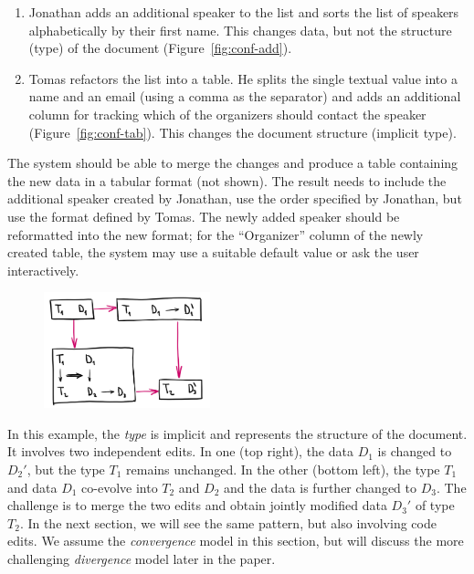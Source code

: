 \documentclass[english,submission]{programming}
\DeclareRobustCommand{\frameworkbox}[2][gray!15]{
\begin{tcolorbox}[breakable,left=3pt,right=3pt,top=3pt,bottom=3pt,colback=#1,colframe=#1,parbox=false,
  width=\dimexpr\textwidth\relax,enlarge left by=0mm,boxsep=5pt,arc=0pt,enlarge top by=0.5em,%
  outer arc=0pt]\setlength{\parskip}{0.5em}#2
\end{tcolorbox}}
\newcommand{\frameworkboxtitle}[1]{\setlength{\parindent}{0em}{\firamedium #1.}\quad}
\begin{document}
\begin{enumerate}
\item Jonathan adds an additional speaker to the list and sorts the list of speakers
  alphabetically by their first name. This changes data, but not the structure (type) of
  the document (Figure~\ref{fig:conf-add}).
\item Tomas refactors the list into a table. He splits the single textual value
  into a name and an email (using a comma as the separator) and adds an additional column for
  tracking which of the organizers should contact the speaker (Figure~\ref{fig:conf-tab}).
  This changes the document structure (implicit type).
\end{enumerate}

\noindent
The system should be able to merge the changes and produce a table containing the new data
in a tabular format (not shown). The result needs to include the additional speaker
created by Jonathan, use the order specified by Jonathan, but use the format defined by
Tomas. The newly added speaker should be reformatted into the new format; for the
``Organizer'' column of the newly created table, the system may use a suitable default value
or ask the user interactively.

\frameworkbox{
\begin{figure}
\vspace{-0.5em}
\includegraphics[width=13em]{figures/arr-datafork.png}
\vspace{-1em}
\end{figure}
\frameworkboxtitle{Merging Data and Code Edits}
In this example, the \emph{type} is implicit and represents the structure of the document.
It involves two independent edits. In one (top right), the data $D_1$ is
changed to $D_2'$, but the type $T_1$ remains unchanged. In the other (bottom left), the
type $T_1$ and data $D_1$ co-evolve into $T_2$ and $D_2$ and the data is further changed
to $D_3$. The challenge is to merge the two edits and obtain jointly modified data $D_3'$
of type $T_2$. In the next section, we will see the same pattern, but also involving
code edits. We assume the \emph{convergence} model in this section, but will discuss
the more challenging \emph{divergence} model later in the paper.}
\end{document}
